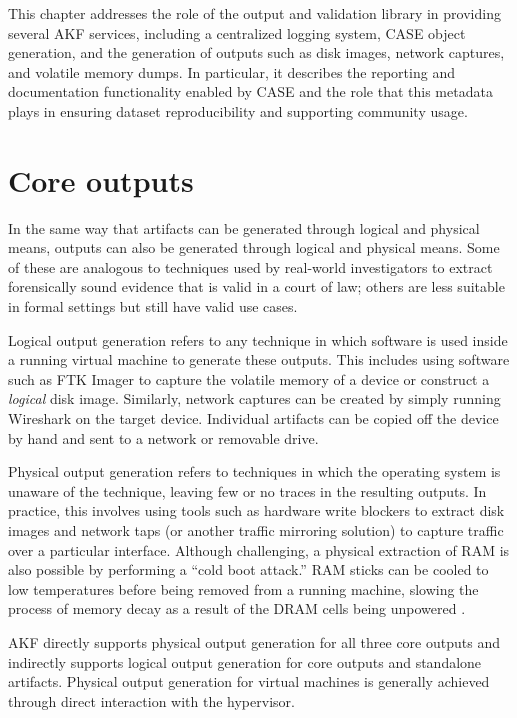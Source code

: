 This chapter addresses the role of the output and validation library in
providing several AKF services, including a centralized logging system,
CASE object generation, and the generation of outputs such as disk
images, network captures, and volatile memory dumps. In particular, it
describes the reporting and documentation functionality enabled by CASE
and the role that this metadata plays in ensuring dataset
reproducibility and supporting community usage.

\section{Core outputs}\label{core-outputs}

In the same way that artifacts can be generated through logical and
physical means, outputs can also be generated through logical and
physical means. Some of these are analogous to techniques used by
real-world investigators to extract forensically sound evidence that is
valid in a court of law; others are less suitable in formal settings but
still have valid use cases.

Logical output generation refers to any technique in which software is
used inside a running virtual machine to generate these outputs. This
includes using software such as FTK Imager
\cite{exterroFTKImagerForensic} to capture the volatile memory of a
device or construct a \emph{logical} disk image. Similarly, network
captures can be created by simply running Wireshark on the target
device. Individual artifacts can be copied off the device by hand and
sent to a network or removable drive.

Physical output generation refers to techniques in which the operating
system is unaware of the technique, leaving few or no traces in the
resulting outputs. In practice, this involves using tools such as
hardware write blockers to extract disk images and network taps (or
another traffic mirroring solution) to capture traffic over a particular
interface. Although challenging, a physical extraction of RAM is also
possible by performing a ``cold boot attack.'' RAM sticks can be cooled
to low temperatures before being removed from a running machine, slowing
the process of memory decay as a result of the DRAM cells being
unpowered \cite{yitbarekColdBootAttacks2017}.

AKF directly supports physical output generation for all three core
outputs and indirectly supports logical output generation for core
outputs and standalone artifacts. Physical output generation for virtual
machines is generally achieved through direct interaction with the
hypervisor.

